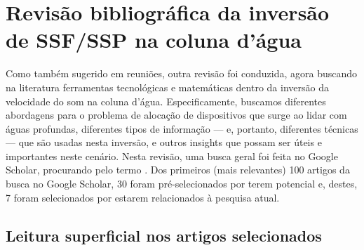 \section{Revisão bibliográfica da inversão de SSF/SSP na coluna d'água}
\label{sec_rssfi}
Como também sugerido em reuniões, outra revisão foi conduzida, agora buscando na literatura ferramentas tecnológicas e matemáticas dentro da inversão da velocidade do som na coluna d'água. Especificamente, buscamos diferentes abordagens para o problema de alocação de dispositivos que surge ao lidar com águas profundas, diferentes tipos de informação --- e, portanto, diferentes técnicas --- que são usadas nesta inversão, e outros insights que possam ser úteis e importantes neste cenário. Nesta revisão, uma busca geral foi feita no Google Scholar, procurando pelo termo . Dos primeiros (mais relevantes) 100 artigos da busca no Google Scholar, 30 foram pré-selecionados por terem potencial e, destes, 7 foram selecionados por estarem relacionados à pesquisa atual.

\subsection{Leitura superficial nos artigos selecionados}

